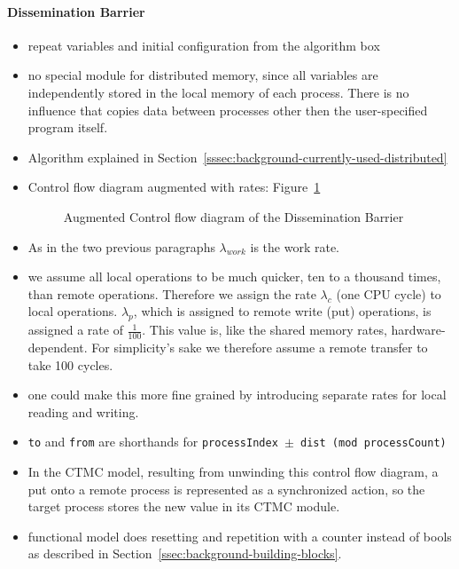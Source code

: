 \documentclass[a4paper, 10pt]{article}
\begin{document}
\paragraph{Dissemination Barrier}
\label{ssssec:analysis-modelchecking-modelling-dissemination}
\begin{itemize}
	\item repeat variables and initial configuration from the algorithm box
	\item no special module for distributed memory, since all variables are independently stored in the local memory of each process. There is no influence that copies data between processes other then the user-specified program itself.
	\item Algorithm explained in Section~\ref{sssec:background-currently-used-distributed}
	\item Control flow diagram augmented with rates: Figure~\ref{fig:model-dissemination}
		\begin{figure}[htbp]
			\centering
			
			\caption{Augmented Control flow diagram of the Dissemination Barrier}
			\label{fig:model-dissemination}
		\end{figure}
	\item As in the two previous paragraphs $\lambda_{work}$ is the work rate.
	\item we assume all local operations to be much quicker, ten to a thousand times, than remote operations. Therefore we assign the rate $\lambda_c$ (one CPU cycle) to local operations. $\lambda_p$, which is assigned to remote write (put) operations, is assigned a rate of $\frac{1}{100}$. This value is, like the shared memory rates, hardware-dependent. For simplicity's sake we therefore assume a remote transfer to take 100 cycles.
	\item one could make this more fine grained by introducing separate rates for local reading and writing.
	\item \texttt{to} and \texttt{from} are shorthands for \texttt{processIndex $\pm$ dist (mod processCount)}
	\item In the CTMC model, resulting from unwinding this control flow diagram, a put onto a remote process is represented as a synchronized action, so the target process stores the new value in its CTMC module.
	\item functional model does resetting and repetition with a counter instead of bools as described in Section~\ref{ssec:background-building-blocks}.
\end{itemize}
\end{document}
